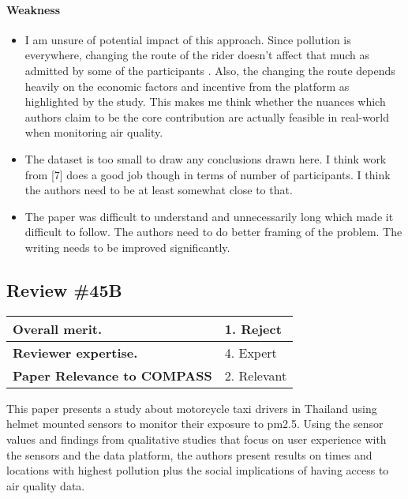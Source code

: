\paragraph{Weakness}
\begin{itemize}
\item
I am unsure of potential impact of this approach. Since pollution is everywhere, changing the route of the rider doesn't affect that much as admitted by some of the participants .
Also, the changing the route depends heavily on the economic factors and incentive from the platform as highlighted by the study. This makes me think whether the nuances which authors claim to be the core contribution are actually feasible in real-world when monitoring air quality.
\item
The dataset is too small to draw any conclusions drawn here. I think work from [7] does a good job though in terms of number of participants. I think the authors need to be at least somewhat close to that.   
\item
The paper was difficult to understand and unnecessarily long which made it difficult to follow. The authors need to do better framing of the problem. The writing needs to be improved significantly.
\end{itemize}


\clearpage
\subsection{Review \#45B}
\begin{table}[h]
\begin{tabular}{|l|l|}
    \hline
    \textbf{Overall merit.} &
1. Reject \\
    \hline
    \textbf{Reviewer expertise.} &
4. Expert \\
    \hline
    \textbf{Paper Relevance to COMPASS} &
2. Relevant \\
    \hline
\end{tabular}
\end{table}

This paper presents a study about motorcycle taxi drivers in Thailand using helmet mounted sensors to monitor their exposure to pm2.5. Using the sensor values and findings from qualitative studies that focus on user experience with the sensors and the data platform, the authors present results on times and locations with highest pollution plus the social implications of having access to air quality data.

